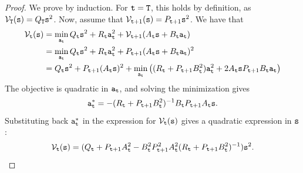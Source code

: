 \begin{leftbar}
\begin{proof}
We prove by induction. For ${\tt t}={\tt T}$, this holds by definition, as $\mathcal{V}_{\tt T}({\tt s}) = Q_{\tt T} {\tt s}^2$. Now, assume that $\mathcal{V}_{{\tt t}+1}({\tt s}) = P_{{\tt t}+1} {\tt s}^2$. We have that 
\begin{equation*}
\begin{split}
        \mathcal{V}_{\tt t}({\tt s}) &= \min_{{\tt a}_{\tt t}} Q_{\tt t} {\tt s}^2 + R_{\tt t} {\tt a}_{\tt t}^2 + \mathcal{V}_{{\tt t}+1}(A_{\tt t} {\tt s} + B_{\tt t} {\tt a}_{\tt t}) \\
        &= \min_{{\tt a}_{\tt t}} Q_{\tt t} {\tt s}^2 + R_{\tt t} {\tt a}_{\tt t}^2 + P_{{\tt t}+1} (A_{\tt t} {\tt s} + B_{\tt t} {\tt a}_{\tt t})^2 \\
        &= Q_{\tt t} {\tt s}^2 + P_{{\tt t}+1} (A_{\tt t} {\tt s})^2 + \min_{{\tt a}_{\tt t}} \left((R_{\tt t} + P_{{\tt t}+1} B_{\tt t}^2) {\tt a}_{\tt t}^2 + 2A_{\tt t} {\tt s} P_{{\tt t}+1} B_{\tt t} {\tt a}_{\tt t}\right)
\end{split}
\end{equation*}
The objective is quadratic in ${\tt a}_{\tt t}$, and solving the minimization gives 
$${\tt a}_{\tt t}^* = -(R_{\tt t} + P_{{\tt t}+1} B_{\tt t}^2)^{-1} B_{\tt t} P_{{\tt t}+1} A_{\tt t} {\tt s}. $$ 
Substituting back ${\tt a}_{\tt t}^*$ in the expression for $\mathcal{V}_{\tt t}({\tt s})$ gives a quadratic expression in ${\tt s}$:
$$
\mathcal{V}_{\tt t}({\tt s}) = (Q_{\tt t} + P_{{\tt t}+1}A_{\tt t}^2 -B_{\tt t}^2 P_{{\tt t}+1}^2 A_{\tt t}^2 (R_{\tt t} + P_{{\tt t}+1} B_{\tt t}^2)^{-1}) {\tt s}^2. 
$$
\end{proof}
\end{leftbar}

